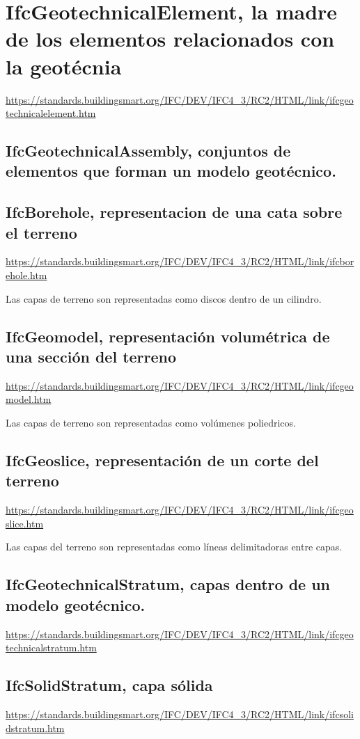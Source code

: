 \documentclass[spanish,12pt,a4paper,final,oneside]{book}
\begin{document}
\section{IfcGeotechnicalElement, la madre de los elementos relacionados con la geotécnia}
\url{https://standards.buildingsmart.org/IFC/DEV/IFC4_3/RC2/HTML/link/ifcgeotechnicalelement.htm}

\subsection{IfcGeotechnicalAssembly, conjuntos de elementos que forman un modelo geotécnico.}

\subsection{IfcBorehole, representacion de una cata sobre el terreno}
\url{https://standards.buildingsmart.org/IFC/DEV/IFC4_3/RC2/HTML/link/ifcborehole.htm}

Las capas de terreno son representadas como discos dentro de un cilindro.

\subsection{IfcGeomodel, representación volumétrica de una sección del terreno}
\url{https://standards.buildingsmart.org/IFC/DEV/IFC4_3/RC2/HTML/link/ifcgeomodel.htm}

Las capas de terreno son representadas como volúmenes poliedricos.

\subsection{IfcGeoslice, representación de un corte del terreno}
\url{https://standards.buildingsmart.org/IFC/DEV/IFC4_3/RC2/HTML/link/ifcgeoslice.htm}

Las capas del terreno son representadas como líneas delimitadoras entre capas.

\subsection{IfcGeotechnicalStratum, capas dentro de un modelo  geotécnico.}
\url{https://standards.buildingsmart.org/IFC/DEV/IFC4_3/RC2/HTML/link/ifcgeotechnicalstratum.htm}

\subsection{IfcSolidStratum, capa sólida}
\url{https://standards.buildingsmart.org/IFC/DEV/IFC4_3/RC2/HTML/link/ifcsolidstratum.htm}
\end{document}
